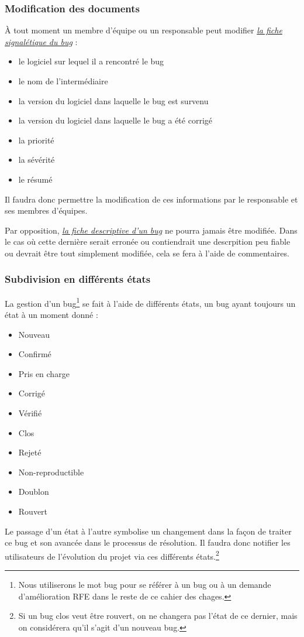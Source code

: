 \documentclass{article}[12pt]
\begin{document}
\subsubsection{Modification des documents}
À tout moment un membre d'équipe ou un responsable peut modifier
\hyperref[sec:sign]{ \textit{la fiche signalétique du bug}} :
\begin{itemize}
	\item le logiciel sur lequel il a rencontré le bug
	\item le nom de l'intermédiaire
	\item la version du logiciel dans laquelle le bug est survenu
	\item la version du logiciel dans laquelle le bug a été corrigé
	\item la priorité
	\item la sévérité
	\item le résumé
\end{itemize}
Il faudra donc permettre la modification de ces informations par le responsable et ses membres d'équipes. \\ \par
Par opposition, \hyperref[sec:desc]{ \textit{la fiche descriptive d'un bug}} ne pourra jamais être modifiée. Dans le cas où cette dernière serait erronée ou contiendrait une descrpition peu fiable ou devrait être tout simplement modifiée, cela se fera à l'aide de commentaires.
\subsubsection{Subdivision en différents états}
La gestion d'un bug\footnote{Nous utiliserons le mot \og bug \fg pour se référer à un bug ou à un demande d'amélioration RFE dans le reste de ce cahier des chages.} se fait à l'aide de différents états, un bug ayant toujours un état à un moment donné :
\begin{itemize}
	\item Nouveau
	\item Confirmé
	\item Pris en charge
	\item Corrigé
	\item Vérifié
	\item Clos
	\item Rejeté
	\item Non-reproductible
	\item Doublon
	\item Rouvert
\end{itemize}
Le passage d'un état à l'autre symbolise un changement dans la façon de traiter ce bug et son avancée dans le processus de résolution. Il faudra donc notifier les utilisateurs de l'évolution du projet via ces différents états.\footnote{Si un bug clos veut être rouvert, on ne changera pas l'état de ce dernier, mais on considérera qu'il s'agit d'un nouveau bug.}
\end{document}
